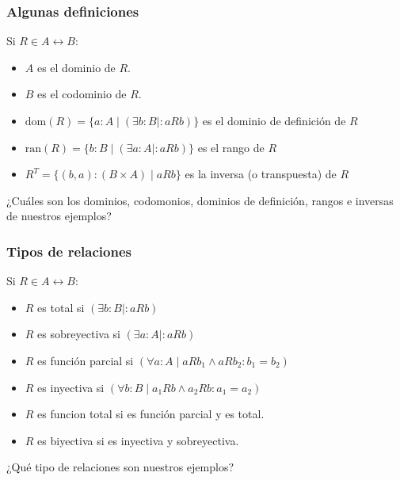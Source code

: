 \documentclass{beamer}
\begin{document}
\begin{frame}[fragile]
    \frametitle{Algunas definiciones}
    Si $R \in A \leftrightarrow B$:
    \begin{itemize}
        \item $A$ es el dominio de $R$.
        \item $B$ es el codominio de $R$.
        \item $\text{dom}(R) = \{a : A \mid (\exists b: B \mid : aRb)\}$ es el dominio de definición de $R$
        \item $\text{ran}(R) = \{b : B \mid (\exists a: A \mid : aRb)\}$ es el rango de $R$
        \item $R^T = \{(b, a) : (B \times A) \mid aRb\}$ es la inversa (o transpuesta) de $R$
    \end{itemize}
    \begin{center}
        ¿Cuáles son los dominios, codomonios, dominios de definición, rangos e inversas de nuestros ejemplos?
    \end{center}
\end{frame}

\begin{frame}[fragile]
    \frametitle{Tipos de relaciones}
    Si $R \in A \leftrightarrow B$:
    \begin{itemize}
        \item $R$ es total si $(\exists b:B \mid : aRb)$
        \item $R$ es sobreyectiva si $(\exists a:A \mid : aRb)$
        \item $R$ es función parcial si $(\forall a:A \mid aRb_{1} \land aRb_{2}: b_1 = b_2)$
        \item $R$ es inyectiva si $(\forall b:B \mid a_1Rb \land a_2Rb: a_1 = a_2)$
        \item $R$ es funcion total si es función parcial y es total.
        \item $R$ es biyectiva si es inyectiva y sobreyectiva.
    \end{itemize}
    \begin{center}
        ¿Qué tipo de relaciones son nuestros ejemplos?
    \end{center}
\end{frame}
\end{document}

